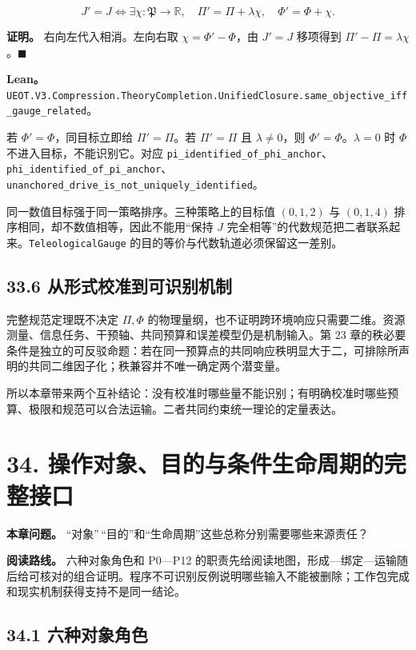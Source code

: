 \documentclass[
  11pt,
  oneside]{book}
\begin{document}
\[J'=J\iff\exists\chi:\mathfrak P\to\mathbb R,
\quad\Pi'=\Pi+\lambda\chi,\quad\Phi'=\Phi+\chi.\]

\textbf{证明。} 右向左代入相消。左向右取 \(\chi=\Phi'-\Phi\)，由 \(J'=J\) 移项得到 \(\Pi'-\Pi=\lambda\chi\)。\(\blacksquare\)

\textbf{Lean。} \nolinkurl{UEOT.V3.Compression.TheoryCompletion.UnifiedClosure.same_objective_iff_gauge_related}。

若 \(\Phi'=\Phi\)，同目标立即给 \(\Pi'=\Pi\)。若 \(\Pi'=\Pi\) 且 \(\lambda\ne0\)，则 \(\Phi'=\Phi\)。\(\lambda=0\) 时 \(\Phi\) 不进入目标，不能识别它。对应 \nolinkurl{pi_identified_of_phi_anchor}、\nolinkurl{phi_identified_of_pi_anchor}、\nolinkurl{unanchored_drive_is_not_uniquely_identified}。

同一数值目标强于同一策略排序。三种策略上的目标值 \((0,1,2)\) 与 \((0,1,4)\) 排序相同，却不数值相等，因此不能用``保持 \(J\) 完全相等''的代数规范把二者联系起来。\nolinkurl{TeleologicalGauge} 的目的等价与代数轨道必须保留这一差别。

\section{33.6 从形式校准到可识别机制}\label{ux4eceux5f62ux5f0fux6821ux51c6ux5230ux53efux8bc6ux522bux673aux5236}

完整规范定理既不决定 \(\Pi,\Phi\) 的物理量纲，也不证明跨环境响应只需要二维。资源测量、信息任务、干预轴、共同预算和误差模型仍是机制输入。第 23 章的秩必要条件是独立的可反驳命题：若在同一预算点的共同响应秩明显大于二，可排除所声明的共同二维因子化；秩兼容并不唯一确定两个潜变量。

所以本章带来两个互补结论：没有校准时哪些量不能识别；有明确校准时哪些预算、极限和规范可以合法运输。二者共同约束统一理论的定量表达。

\chapter{34. 操作对象、目的与条件生命周期的完整接口}\label{ch-34}

\textbf{本章问题。} ``对象''\,``目的''和``生命周期''这些总称分别需要哪些来源责任？

\textbf{阅读路线。} 六种对象角色和 P0---P12 的职责先给阅读地图，形成---绑定---运输随后给可核对的组合证明。程序不可识别反例说明哪些输入不能被删除；工作包完成和现实机制获得支持不是同一结论。

\section{34.1 六种对象角色}\label{ux516dux79cdux5bf9ux8c61ux89d2ux8272}
\end{document}

